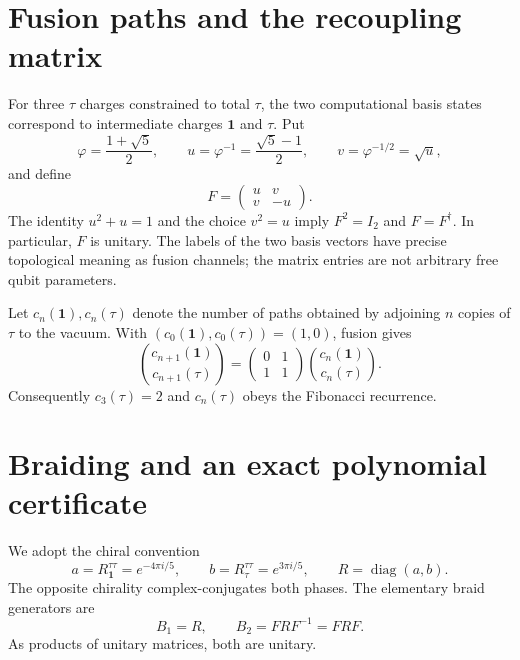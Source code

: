 \documentclass[11pt,a4paper]{article}
\theoremstyle{remark}
\newcommand{\one}{\mathbf{1}}
\begin{document}
\section{Fusion paths and the recoupling matrix}
For three $\tau$ charges constrained to total $\tau$, the two computational basis states correspond to intermediate charges $\one$ and $\tau$. Put
\begin{equation}\label{eq:f}
\varphi=\frac{1+\sqrt5}{2},\qquad u=\varphi^{-1}=\frac{\sqrt5-1}{2},\qquad v=\varphi^{-1/2}=\sqrt{u},
\end{equation}
and define
\begin{equation}
F=\begin{pmatrix}u&v\\v&-u\end{pmatrix}.
\end{equation}
The identity $u^2+u=1$ and the choice $v^2=u$ imply $F^2=I_2$ and $F=F^\dagger$. In particular, $F$ is unitary. The labels of the two basis vectors have precise topological meaning as fusion channels; the matrix entries are not arbitrary free qubit parameters.

Let $c_n(\one),c_n(\tau)$ denote the number of paths obtained by adjoining $n$ copies of $\tau$ to the vacuum. With $(c_0(\one),c_0(\tau))=(1,0)$, fusion gives
\begin{equation}
\binom{c_{n+1}(\one)}{c_{n+1}(\tau)}=
\begin{pmatrix}0&1\\1&1\end{pmatrix}
\binom{c_n(\one)}{c_n(\tau)}.
\end{equation}
Consequently $c_3(\tau)=2$ and $c_n(\tau)$ obeys the Fibonacci recurrence.

\section{Braiding and an exact polynomial certificate}
We adopt the chiral convention
\begin{equation}\label{eq:r}
a=R_{\one}^{\tau\tau}=e^{-4\pi i/5},\qquad
b=R_{\tau}^{\tau\tau}=e^{3\pi i/5},\qquad
R=\operatorname{diag}(a,b).
\end{equation}
The opposite chirality complex-conjugates both phases. The elementary braid generators are
\begin{equation}\label{eq:braid}
B_1=R,\qquad B_2=FRF^{-1}=FRF.
\end{equation}
As products of unitary matrices, both are unitary.
\end{document}

